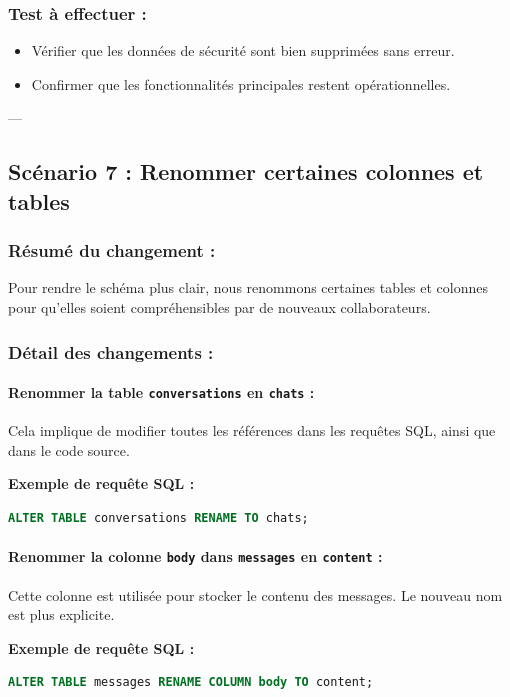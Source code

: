 \documentclass[a4paper,11pt]{article}
\begin{document}
\subsubsection*{Test à effectuer :}
\begin{itemize}
    \item Vérifier que les données de sécurité sont bien supprimées sans erreur.
    \item Confirmer que les fonctionnalités principales restent opérationnelles.
\end{itemize}

---

\subsection*{Scénario 7 : Renommer certaines colonnes et tables}

\subsubsection*{Résumé du changement :}
Pour rendre le schéma plus clair, nous renommons certaines tables et colonnes pour qu'elles soient compréhensibles par de nouveaux collaborateurs.

\subsubsection*{Détail des changements :}

\paragraph{Renommer la table \texttt{conversations} en \texttt{chats} :}
Cela implique de modifier toutes les références dans les requêtes SQL, ainsi que dans le code source.

\textbf{Exemple de requête SQL :}
\begin{lstlisting}[language=SQL]
ALTER TABLE conversations RENAME TO chats;
\end{lstlisting}

\paragraph{Renommer la colonne \texttt{body} dans \texttt{messages} en \texttt{content} :}
Cette colonne est utilisée pour stocker le contenu des messages. Le nouveau nom est plus explicite.

\textbf{Exemple de requête SQL :}
\begin{lstlisting}[language=SQL]
ALTER TABLE messages RENAME COLUMN body TO content;
\end{lstlisting}
\end{document}
